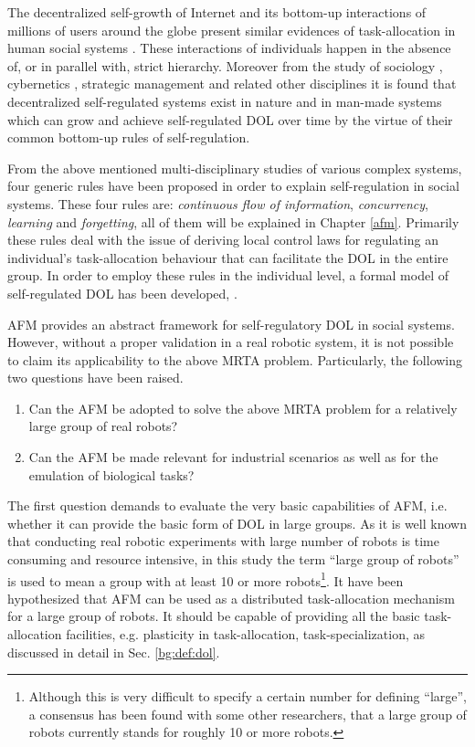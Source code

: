 The decentralized self-growth of Internet and its bottom-up interactions of millions of users around the globe present similar evidences of task-allocation in human social systems \cite{Andriani+2004}. These interactions of individuals happen in the absence of, or in parallel with, strict hierarchy. Moreover from the study of sociology \cite{Sayer+1992}, cybernetics \cite{Beer1981}, strategic management \cite{Kogut2000} and related other disciplines it is found that decentralized self-regulated systems exist in nature and in man-made systems which can grow and achieve self-regulated DOL over time by the virtue of their common bottom-up rules of self-regulation.
 
From the above mentioned multi-disciplinary studies of various complex systems, four generic rules have been proposed in order to explain self-regulation in social systems. These four rules are: \textit{continuous flow of information}, \textit{concurrency}, \textit{learning} and \textit{forgetting}, all of them will be explained in Chapter \ref{afm}. Primarily these rules deal with the issue of deriving local control laws for regulating an individual's task-allocation behaviour that can facilitate the DOL in the entire group. In order to employ these rules in the individual level, a formal model of self-regulated DOL has been developed, .

AFM provides an abstract framework for self-regulatory DOL in social systems. However, without a proper validation in a real robotic system, it is not possible to claim its applicability to the above MRTA problem. Particularly, the following two questions have been raised.
\begin{enumerate}
\item Can the AFM be adopted to solve the above MRTA problem for a relatively large group of real robots?
\item Can the AFM be made relevant for industrial scenarios as well as for the emulation of biological tasks?
\end{enumerate}
The first question demands to evaluate the very basic capabilities of AFM, i.e. whether it can provide the basic form of DOL in large groups. As it is well known that conducting real robotic experiments with large number of robots is time consuming and resource intensive, in this study the term ``large group of robots'' is used to mean a group with at least 10 or more robots\footnote{Although this is very difficult to specify a certain number for defining ``large'', a consensus has been found with some other researchers, \protect{} that a large group of robots currently stands for roughly 10 or more robots.}. It have been hypothesized that AFM can be used as a distributed task-allocation mechanism for a large group of robots. It should be capable of providing all the basic task-allocation facilities, e.g. plasticity in task-allocation, task-specialization, as discussed in detail in Sec. \ref{bg:def:dol}.

